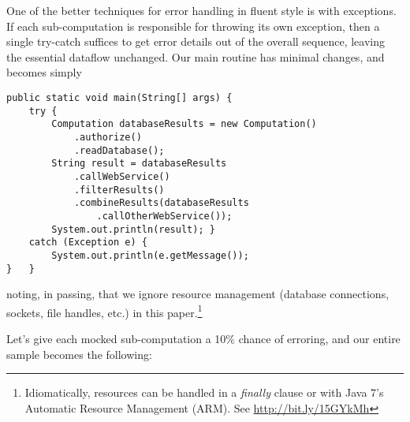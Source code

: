 \documentclass[11pt]{article}
\begin{document}
One of the better techniques for error handling in fluent style is
with exceptions. If each sub-computation is responsible for
throwing its own exception, then a single try-catch suffices to get
error details out of the overall sequence, leaving the essential
dataflow unchanged. Our main routine has minimal changes, and
becomes simply

\begin{verbatim}
public static void main(String[] args) {
    try {
        Computation databaseResults = new Computation()
            .authorize()
            .readDatabase();
        String result = databaseResults
            .callWebService()
            .filterResults()
            .combineResults(databaseResults
                .callOtherWebService());
        System.out.println(result); }
    catch (Exception e) {
        System.out.println(e.getMessage());
}   }
\end{verbatim}
noting, in passing, that we ignore resource management (database
connections, sockets, file handles, etc.) in this
paper.\footnote{Idiomatically, resources can be handled in a
   \emph{finally} clause or with Java 7's Automatic Resource Management (ARM).
   See \url{http://bit.ly/15GYkMh}}

Let's give each mocked sub-computation a \mbox{10\%} chance of
erroring, and our entire sample becomes the following:
\end{document}
